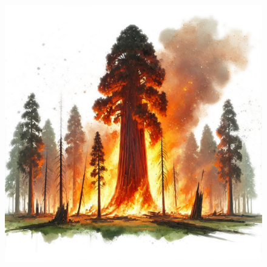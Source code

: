 \documentclass[a5paper,11pt]{memoir}
\begin{document}
\begin{figure}
	\vspace{-1.5cm}
	\hspace{-32pt}
	\includegraphics[width=\paperwidth]{images/redwood-fire.png}
\end{figure}

\newpage
\end{document}
